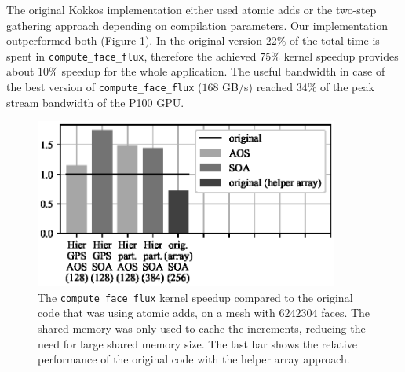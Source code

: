 The original Kokkos implementation either used atomic adds or the two-step
gathering approach depending on compilation parameters. Our implementation
outperformed both (Figure \ref{fig:mini_aero_speedup_small-cache}). In the 
original version $22\%$ of the total time is spent 
in \texttt{compute\_face\_flux}, therefore the achieved $75\%$ kernel 
speedup provides about $10\%$ speedup for the whole application. The 
useful bandwidth in case of the best version of \texttt{compute\_face\_flux} 
($168$ GB/s) reached $34\%$ of the peak stream bandwidth of the P100 GPU.

\begin{figure}[Htbp]
  \centering
  \includegraphics[width=10cm]{fig/mini_aero_speedup_nocache.eps}
  \caption{The \texttt{compute\_face\_flux} kernel speedup compared to the
  original code that was using atomic adds, on a mesh with
  $6242304$ faces. The shared memory was only used to cache the increments,
  reducing the need for large shared memory size. The last bar shows the
  relative performance of the original code with the helper array approach.}
  \label{fig:mini_aero_speedup_small-cache}
\end{figure}

